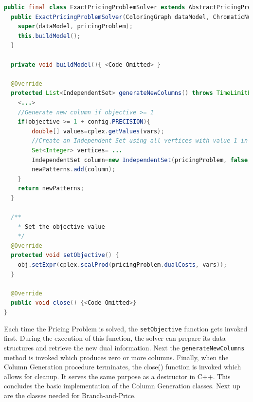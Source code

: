 \documentclass[a4paper]{article}
\newenvironment{myblock}[1]{%
    \tcolorbox[beamer,%
    noparskip,breakable,
    colback=lightBlueCodeBlock,colframe=darkBlueCodeBlock,%
    colbacklower=darkBlueCodeBlock!75!lightBlueCodeBlock,%
    coltitle=blueTitleCodeBlock,
    title=#1]}%
    {\endtcolorbox}
\newcommand{\code}[1]{\lstinline[language=java, style=seminar]!#1!}
\begin{document}
\begin{myblock}{ExactPricingProblemSolver}
\begin{lstlisting}[language=java, style=eclipseArticle, xleftmargin=2em]  
public final class ExactPricingProblemSolver extends AbstractPricingProblemSolver<ColoringGraph, IndependentSet, ChromaticNumberPricingProblem> {
  public ExactPricingProblemSolver(ColoringGraph dataModel, ChromaticNumberPricingProblem pricingProblem) {
    super(dataModel, pricingProblem);
    this.buildModel();
  }
	
  private void buildModel(){ <Code Omitted> }

  @Override
  protected List<IndependentSet> generateNewColumns() throws TimeLimitExceededException {
    <...>
    //Generate new column if objective >= 1
    if(objective >= 1 + config.PRECISION){
	    double[] values=cplex.getValues(vars);
	    //Create an Independent Set using all vertices with value 1 in the pricing problem
	    Set<Integer> vertices= ...
	    IndependentSet column=new IndependentSet(pricingProblem, false, this.getName(), vertices, 1);
	    newPatterns.add(column);
    }
    return newPatterns;
  }

  /**
    * Set the objective value
    */
  @Override
  protected void setObjective() {
    obj.setExpr(cplex.scalProd(pricingProblem.dualCosts, vars));
  }

  @Override
  public void close() {<Code Omitted>}
}
\end{lstlisting}
\end{myblock}
Each time the Pricing Problem is solved, the \code{setObjective} function gets invoked first. During the execution of this function, the solver can prepare its data structures and retrieve the new dual information. Next the \code{generateNewColumns} method is invoked which produces zero or more columns. Finally, when the Column Generation procedure terminates, the close() function is invoked which allows for cleanup. It serves the same purpose as a destructor in C++. This concludes the basic implementation of the Column Generation classes. Next up are the classes needed for Branch-and-Price.\\
\end{document}
